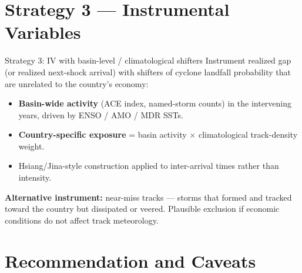 \documentclass[aspectratio=169]{beamer}
\begin{document}
\section{Strategy 3 --- Instrumental Variables}
\begin{frame}\sectionpage\end{frame}

\begin{frame}{Strategy 3: IV with basin-level / climatological shifters}
Instrument realized gap (or realized next-shock arrival) with shifters of cyclone landfall probability that are unrelated to the country's economy:

\medskip
\begin{itemize}
  \item \textbf{Basin-wide activity} (ACE index, named-storm counts) in the intervening years, driven by ENSO / AMO / MDR SSTs.
  \item \textbf{Country-specific exposure} = basin activity $\times$ climatological track-density weight.
  \item Hsiang/Jina-style construction applied to inter-arrival times rather than intensity.
\end{itemize}

\medskip
\textbf{Alternative instrument:} near-miss tracks --- storms that formed and tracked toward the country but dissipated or veered. Plausible exclusion if economic conditions do not affect track meteorology.
\end{frame}

\section{Recommendation and Caveats}
\begin{frame}\sectionpage\end{frame}
\end{document}
